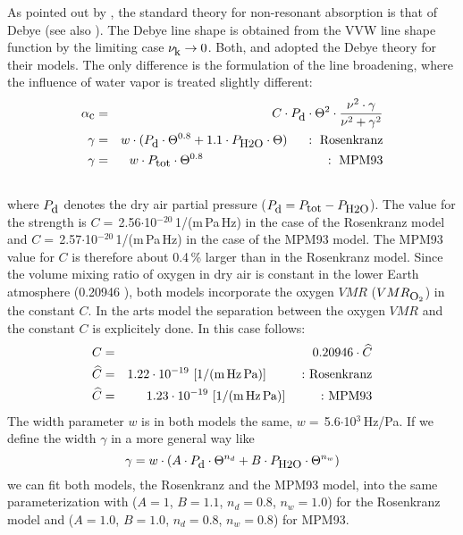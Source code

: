 {
\label{levelc:o2cont}
As pointed out by \citet{vv:87}, the standard theory for
non-resonant absorption is that of Debye (see also \citet{townes:55}). 
The Debye line shape is obtained from the VVW line shape function 
by the limiting case $\nu_{\mbox{\rm \small k}} \rightarrow 0$.
Both, \citet{liebeetal:93} and \citet{pwr:93} adopted the
Debye theory for their models. The only difference is the formulation
of the line broadening, where the influence of water vapor is treated 
slightly different: 
\begin{eqnarray}
  \label{eq:abs_cont_pwr_o2}
  \alphac &=&  C \cdot \pda \cdot \Theta^2 \cdot 
             \frac{\nu^2 \cdot \gamma}{\nu^2+\gamma^2}\\
  \label{eq:abs_cont_pwr_o2_1}
  \gamma &=&  w \cdot (\pda\cdot \Theta^{0.8} + 1.1 \cdot \phzo \cdot
  \Theta)\hspace*{5mm}:~\mbox{Rosenkranz}\\
  \label{eq:abs_cont_pwr_o2_2}
  \gamma &=&  w \cdot \ptot \cdot \Theta^{0.8}\hspace*{34mm}:~\mbox{MPM93}\\
\nonumber
\end{eqnarray}
where $P_{\mbox{\rm \small d}}$ denotes the dry air partial pressure ($P_{\mbox{\rm \small d}}=P_{\mbox{\rm \small tot}}-P_{\mbox{\rm \small H2O}}$). 
The value for the strength is $C =$\,2.56$\cdot$10$^{-20}$\,1/(m\,Pa\,Hz) 
in the case of the Rosenkranz model and 
$C =$\,2.57$\cdot$10$^{-20}$\,1/(m\,Pa\,Hz) in the case of the MPM93 model.
The MPM93 value for $C$ is therefore about 0.4\,\% larger than in the 
Rosenkranz model. Since the volume mixing ratio of oxygen in dry air
is constant in the lower Earth atmosphere (0.20946 \citep{goody:95}), 
both models incorporate the oxygen $VMR$ ($VMR_{\mbox{\rm \small O}_{2}}$) in the 
constant $C$. In the arts model the separation between the oxygen
$VMR$ and the constant $C$ is explicitely done. In this case follows:
\begin{eqnarray} 
 \label{eq:o2cont_const_vmr_1}
 C &=& 0.20946 \cdot \widehat{C}\\
 \label{eq:o2cont_const_vmr_2}
 \widehat{C} &=& 1.22\cdot 10^{-19}~\mbox{[1/(m\,Hz\,Pa)]\hspace{10mm}:~Rosenkranz} \\
 \label{eq:o2cont_const_vmr_3}
 \widehat{C} &=& 1.23\cdot 10^{-19}~\mbox{[1/(m\,Hz\,Pa)]\hspace{10mm}:~MPM93} 
\end{eqnarray} 
The width parameter $w$ is in both models the same, 
$w =$\,5.6$\cdot$10$^{3}$\,Hz/Pa. If we define the width $\gamma$ in a more 
general way like
\begin{equation} 
 \label{eq:o2_cont_gamma_general}
 \gamma = w \cdot \left( A \cdot P_{\mbox{\rm \small d}}  \cdot \Theta^{n_d} + 
                   B \cdot P_{\mbox{\rm \small H2O}} \cdot \Theta^{n_w} \right) 
\end{equation}
we can fit both models, the Rosenkranz and the MPM93 model, into the 
same parameterization with ($A=1$, $B=1.1$, $n_d=0.8$, $n_w=1.0$) for 
the Rosenkranz model and ($A=1.0$, $B=1.0$, $n_d=0.8$, $n_w=0.8$) for 
MPM93.

}
